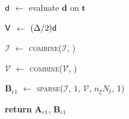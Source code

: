 \begin{vAlgorithm}[!ht]{1\columnwidth}{0em}
{$\textup{\textsf{d}}$ $\gets$ evaluate $\bm{d}$ on $\bm{t}$

$\textup{\textsf{V}}$ $\gets$ $(\Delta/2) \textup{\textsf{d}}$

$\mathcal{I}$ $\gets$ \textsc{combine}($\mathcal{I}$, )

$\mathcal{V}$ $\gets$ \textsc{combine}($\mathcal{V}$, )

}

$\mathbf{B}_{e1}$ $\gets$ \textsc{sparse}($\mathcal{I}$, $1$, $\mathcal{V}$, $n_\xi N_t$, 1) 

\textbf{return} $\mathbf{A}_{e1}$, $\mathbf{B}_{e1}$ 


\end{vAlgorithm}













